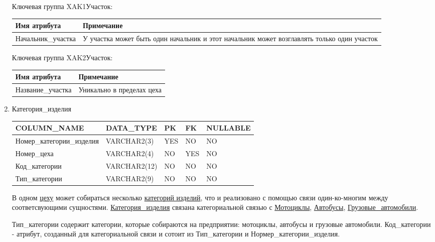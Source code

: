 \begin{enumerate}
    Ключевая группа XAK1Участок:

    \begin{tabular}{|p{7cm}|p{9.3cm}|} \hline

        {\bf Имя атрибута} & {\bf Примечание} \\ \hline
        Начальник\_участка & У участка может быть один начальник и этот начальник может возглавлять только один участок \\ \hline

    \end{tabular}

    Ключевая группа XAK2Участок:

    \begin{tabular}{|p{7cm}|p{9.3cm}|} \hline

        {\bf Имя атрибута} & {\bf Примечание} \\ \hline
        Название\_участка & Уникально в пределах цеха \\ \hline

    \end{tabular}

    \item{Категория\_изделия}

    \begin{tabular}{|p{7cm}|p{3cm}|p{1cm}|p{1cm}|p{3cm}|} \hline

        {\bf COLUMN\_NAME} & {\bf DATA\_TYPE} & {\bf PK} & {\bf FK} & {\bf NULLABLE} \\ \hline
        Номер\_категории\_изделия & VARCHAR2(3) & YES & NO & NO \\ \hline
        Номер\_цеха & VARCHAR2(4) & NO & YES & NO \\ \hline
        Код\_категории & VARCHAR2(12) & NO & NO & NO \\ \hline
        Тип\_категории & VARCHAR2(9) & NO & NO & NO \\ \hline

    \end{tabular}

    В одном \underline{цеху} может собираться несколько \underline{категорий изделий}, что и реализовано с помощью связи один-ко-многим между соответсвующими сущностями.
    \underline{Категория\_изделия} связана категориальной связью с \underline{Мотоциклы}, \underline{Автобусы}, \underline{Грузовые\_автомобили}.

    Тип\_категории содержит категории, которые собираются на предприятии: мотоциклы, автобусы и грузовые автомобили.
    Код\_категории - атрибут, созданный для категориальной связи и сотоит из Тип\_категории и Нормер\_категории\_изделия.


\end{enumerate}
